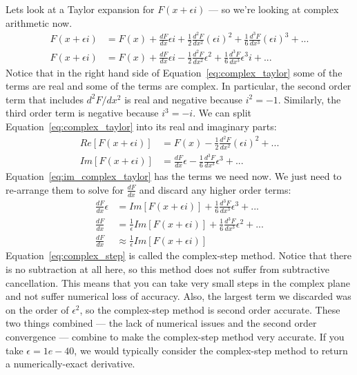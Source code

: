 \documentclass[conf]{new-aiaa}
\begin{document}
    Lets look at a Taylor expansion for $F(x+\epsilon i)$ --- so we're looking at complex arithmetic now. 
    \begin{align}
        F(x+\epsilon i) &= F(x) + \frac{dF}{dx}\epsilon i + \frac{1}{2}\frac{d^2F}{dx^2} (\epsilon i)^2 +  \frac{1}{6}\frac{d^3F}{dx^3} (\epsilon i)^3 + ... \\
        F(x+\epsilon i) &= F(x) + \frac{dF}{dx}\epsilon i - \frac{1}{2}\frac{d^2F}{dx^2} \epsilon^2 +  \frac{1}{6}\frac{d^3F}{dx^3} \epsilon^3 i + ... \label{eq:complex_taylor}
    \end{align}
    Notice that in the right hand side of Equation~\eqref{eq:complex_taylor} some of the terms are real and some of the terms are complex. 
    In particular, the second order term that includes $d^2F/dx^2$ is real and negative because $i^2=-1$.  
    Similarly, the third order term is negative because $i^3=-i$.
    We can split Equation~\eqref{eq:complex_taylor} into its real and imaginary parts: 
    \begin{align}
        Re[F(x+\epsilon i)] &= F(x) - \frac{1}{2}\frac{d^2F}{dx^2} (\epsilon i)^2 + ... \\
        Im[F(x+\epsilon i)] &= \frac{dF}{dx}\epsilon -  \frac{1}{6}\frac{d^3F}{dx^3} \epsilon^3 + ... \label{eq:im_complex_taylor}
    \end{align}
    Equation~\eqref{eq:im_complex_taylor} has the terms we need now. 
    We just need to re-arrange them to solve for $\frac{dF}{dx}$ and discard any higher order terms: 
    \begin{align}
        \frac{dF}{dx}\epsilon  &= Im[F(x+\epsilon i)] + \frac{1}{6}\frac{d^3F}{dx^3} \epsilon^3 + ... \\
        \frac{dF}{dx}  &= \frac{1}{\epsilon}Im[F(x+\epsilon i)] + \frac{1}{6}\frac{d^3F}{dx^3} \epsilon^2 + ... \\
        \frac{dF}{dx}  &\approx \frac{1}{\epsilon}Im[F(x+\epsilon i)] \label{eq:complex_step}
    \end{align}
    Equation~\eqref{eq:complex_step} is called the complex-step method. 
    Notice that there is no subtraction at all here, so this method does not suffer from subtractive cancellation. 
    This means that you can take very small steps in the complex plane and not suffer numerical loss of accuracy. 
    Also, the largest term we discarded was on the order of $\epsilon^2$, so the complex-step method is second order accurate. 
    These two things combined --- the lack of numerical issues and the second order convergence --- combine to make the complex-step method very accurate. 
    If you take $\epsilon=1e-40$, we would typically consider the complex-step method to return a numerically-exact derivative. 
\end{document}
